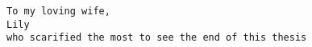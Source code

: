 \begin{dedication}
\texttt{To my loving wife,}\\
\texttt{Lily}\\
\texttt{who scarified the most to see the end of this thesis}
\end{dedication}
